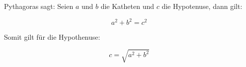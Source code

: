 
Pythagoras sagt: Seien $a$ und $b$ die Katheten und $c$ die
Hypotenuse, dann gilt: 

\begin{displaymath}
  a^2+b^2=c^2 
\end{displaymath}
 
Somit gilt für die Hypothenuse: 

\begin{displaymath}
  c=\sqrt{a^2+b^2} 
\end{displaymath}
